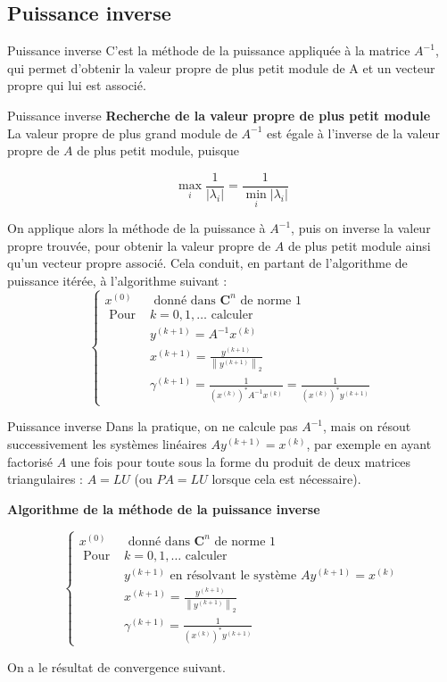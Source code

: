\documentclass[french, 10pt]{beamer}
\theoremstyle{definition}
\begin{document}
\subsection{Puissance inverse}
\begin{frame}{Puissance inverse }
C’est la méthode de la puissance appliquée à la matrice $A^{-1}$, qui permet d’obtenir la
valeur propre de plus petit module de A et un vecteur propre qui lui est associé.
\end{frame}
\begin{frame}{Puissance inverse }
\textbf{Recherche de la valeur propre de plus petit module}\\
La valeur propre de plus grand module de $A^{-1}$ est égale à l'inverse de la valeur propre de $A$ de plus petit module, puisque

$$
\max _i \frac{1}{\left|\lambda_i\right|}=\frac{1}{\min _i\left|\lambda_i\right|}
$$


On applique alors la méthode de la puissance à $A^{-1}$, puis on inverse la valeur propre trouvée, pour obtenir la valeur propre de $A$ de plus petit module ainsi qu'un vecteur propre associé. Cela conduit, en partant de l'algorithme de puissance itérée, à l'algorithme suivant :
$$
\begin{cases}x^{(0)} & \text { donné dans } \mathbf{C}^n \text { de norme } 1 \\ \text { Pour } & k=0,1, \ldots \text { calculer } \\ & y^{(k+1)}=A^{-1} x^{(k)} \\ & x^{(k+1)}=\frac{y^{(k+1)}}{\left\|y^{(k+1)}\right\|_2} \\ & \gamma^{(k+1)}=\frac{1}{\left(x^{(k)}\right)^* A^{-1} x^{(k)}}=\frac{1}{\left(x^{(k)}\right)^* y^{(k+1)}}\end{cases}
$$

\end{frame}
\begin{frame}{Puissance inverse }
Dans la pratique, on ne calcule pas $A^{-1}$, mais on résout successivement les systèmes linéaires $A y^{(k+1)}=x^{(k)}$, par exemple en ayant factorisé $A$ une fois pour toute sous la forme du produit de deux matrices triangulaires : $A=L U$ (ou $P A=L U$ lorsque cela est nécessaire).

\begin{center}
    \textbf{Algorithme de la méthode de la puissance inverse}
\end{center}

\begin{equation}
\begin{cases}x^{(0)} & \text { donné dans } \mathbf{C}^n \text { de norme } 1 \\ \text { Pour } & k=0,1, \ldots \text { calculer } \\ & y^{(k+1)} \text { en résolvant le système } A y^{(k+1)}=x^{(k)} \\ & x^{(k+1)}=\frac{y^{(k+1)}}{\left\|y^{(k+1)}\right\|_2} \\ & \gamma^{(k+1)}=\frac{1}{\left(x^{(k)}\right)^* y^{(k+1)}}\end{cases}
\end{equation}

On a le résultat de convergence suivant.
\end{frame}
\end{document}
